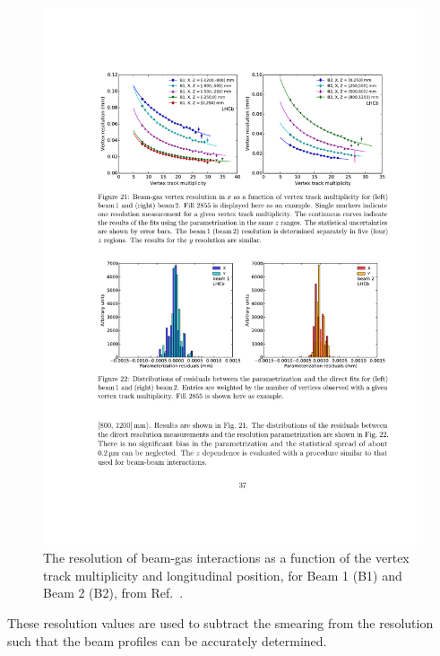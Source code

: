 \begin{figure}[!h]
    \centering
    \includegraphics[width=1.0\textwidth]{figs/Detector/lumi_bgi_track_z_res.pdf}
    \caption{The resolution of beam-gas interactions as a function of the vertex track multiplicity and longitudinal position, for Beam 1 (B1) and Beam 2 (B2), from Ref.~\cite{1748-0221-9-12-P12005}.}
    \label{fig:Dec_bgi_res}   
\end{figure}
These resolution values are used to subtract the smearing from the \velo resolution such that the beam profiles can be accurately determined. 



